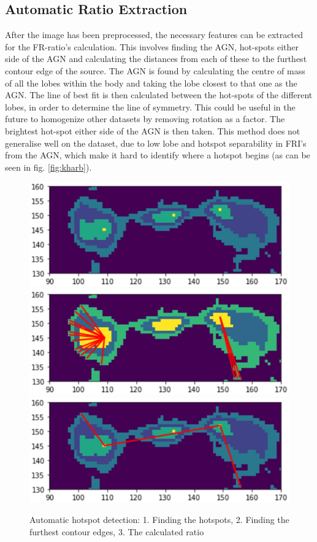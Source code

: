 \documentclass[conference]{IEEEtran}
\begin{document}
\subsection{Automatic Ratio Extraction}
After the image has been preprocessed, the necessary features can be extracted for the FR-ratio's calculation. This involves finding the AGN, hot-spots either side of the AGN and calculating the distances from each of these to the furthest contour edge of the source. The AGN is found by calculating the centre of mass of all the lobes within the body and taking the lobe closest to that one as the AGN. The line of best fit is then calculated between the hot-spots of the different lobes, in order to determine the line of symmetry. This could be useful in the future to homogenize other datasets by removing rotation as a factor. The brightest hot-spot either side of the AGN is then taken. This method does not generalise well on the dataset, due to low lobe and hotspot separability in FRI's from the AGN, which make it hard to identify where a hotspot begins (as can be seen in fig. \ref{fig:kharb}).

\begin{figure}[!h]
    \centering
    \includegraphics[width=0.5 \textwidth]{EPS/hotspots.eps}
    \includegraphics[width=0.5 \textwidth]{EPS/findingfurthestpoint.eps}
    \includegraphics[width=0.5 \textwidth]{EPS/ratioauto.eps}
    
    \caption{Automatic hotspot detection: 1. Finding the hotspots, 2. Finding the furthest contour edges, 3. The calculated ratio}
    \label{fig:hotspotsss}
\end{figure}
\end{document}
